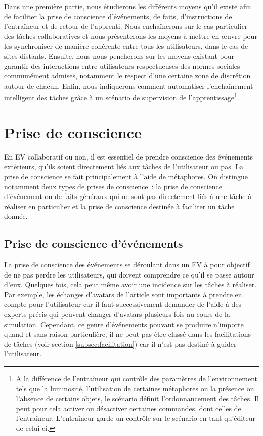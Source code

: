 \documentclass[11pt]{article}
\begin{document}
Dans une première partie, nous étudierons les différents moyens qu'il existe afin de faciliter la prise de conscience d'événements, de faits, d'instructions de l'entraîneur et de retour de l'apprenti. Nous enchaînerons sur le cas particulier des tâches collaboratives et nous présenterons les moyens à mettre en œuvre pour les synchroniser de manière cohérente entre tous les utilisateurs, dans le cas de sites distants. Ensuite, nous nous pencherons sur les moyens existant pour garantir des interactions entre utilisateurs respectueuses des normes sociales communément admises, notamment le respect d'une certaine zone de discrétion autour de chacun. Enfin, nous indiquerons comment automatiser l'enchaînement intelligent des tâches grâce à un scénario de supervision de l'apprentissage\footnote{A la différence de l'entraîneur qui contrôle des paramètres de l'environnement tels que la luminosité, l'utilisation de certaines métaphores ou la présence ou l'absence de certains objets, le scénario définit l'ordonnancement des tâches. Il peut pour cela activer ou désactiver certaines commandes, dont celles de l'entraîneur. L'entraîneur garde un contrôle sur le scénario en tant qu'éditeur de celui-ci.}.

\section{Prise de conscience}

En EV collaboratif ou non, il est essentiel de prendre conscience des événements extérieurs, qu'ils soient directement liés aux tâches de l'utilisateur ou pas. La prise de conscience se fait principalement à l'aide de métaphores. On distingue notamment deux types de prises de conscience~: la prise de conscience d'événement ou de faits généraux qui ne sont pas directement liés à une tâche à réaliser en particulier et la prise de conscience destinée à faciliter un tâche donnée.

\subsection{Prise de conscience d'événements}
La prise de conscience des événements se déroulant dans un EV à pour objectif de ne pas perdre les utilisateurs, qui doivent comprendre ce qu'il se passe autour d'eux. Quelques fois, cela peut même avoir une incidence sur les tâches à réaliser. Par exemple, les échanges d'avatars de l'article \cite{avatars} sont importants à prendre en compte pour l'utilisateur car il faut successivement demander de l'aide à des experts précis qui peuvent changer d'avatars plusieurs fois au cours de la simulation. Cependant, ce genre d'événements pouvant se produire n'importe quand et sans raison particulière, il ne peut pas être classé dans les facilitations de tâches (voir section \ref{subsec:facilitation}) car il n'est pas destiné à guider l'utilisateur.
\\
\end{document}

